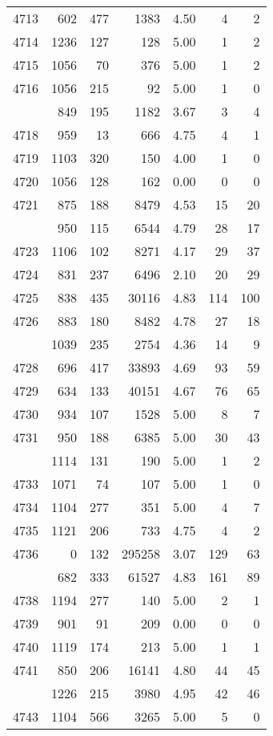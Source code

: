 \documentclass[
]{article}
\begin{document}
\begin{table}
\begin{tabular}[t]{lrrrrrr}
4713 & 602 & 477 & 1383 & 4.50 & 4 & 2\\
4714 & 1236 & 127 & 128 & 5.00 & 1 & 2\\
4715 & 1056 & 70 & 376 & 5.00 & 1 & 2\\
4716 & 1056 & 215 & 92 & 5.00 & 1 & 0\\
\addlinespace
4717 & 849 & 195 & 1182 & 3.67 & 3 & 4\\
4718 & 959 & 13 & 666 & 4.75 & 4 & 1\\
4719 & 1103 & 320 & 150 & 4.00 & 1 & 0\\
4720 & 1056 & 128 & 162 & 0.00 & 0 & 0\\
4721 & 875 & 188 & 8479 & 4.53 & 15 & 20\\
\addlinespace
4722 & 950 & 115 & 6544 & 4.79 & 28 & 17\\
4723 & 1106 & 102 & 8271 & 4.17 & 29 & 37\\
4724 & 831 & 237 & 6496 & 2.10 & 20 & 29\\
4725 & 838 & 435 & 30116 & 4.83 & 114 & 100\\
4726 & 883 & 180 & 8482 & 4.78 & 27 & 18\\
\addlinespace
4727 & 1039 & 235 & 2754 & 4.36 & 14 & 9\\
4728 & 696 & 417 & 33893 & 4.69 & 93 & 59\\
4729 & 634 & 133 & 40151 & 4.67 & 76 & 65\\
4730 & 934 & 107 & 1528 & 5.00 & 8 & 7\\
4731 & 950 & 188 & 6385 & 5.00 & 30 & 43\\
\addlinespace
4732 & 1114 & 131 & 190 & 5.00 & 1 & 2\\
4733 & 1071 & 74 & 107 & 5.00 & 1 & 0\\
4734 & 1104 & 277 & 351 & 5.00 & 4 & 7\\
4735 & 1121 & 206 & 733 & 4.75 & 4 & 2\\
4736 & 0 & 132 & 295258 & 3.07 & 129 & 63\\
\addlinespace
4737 & 682 & 333 & 61527 & 4.83 & 161 & 89\\
4738 & 1194 & 277 & 140 & 5.00 & 2 & 1\\
4739 & 901 & 91 & 209 & 0.00 & 0 & 0\\
4740 & 1119 & 174 & 213 & 5.00 & 1 & 1\\
4741 & 850 & 206 & 16141 & 4.80 & 44 & 45\\
\addlinespace
4742 & 1226 & 215 & 3980 & 4.95 & 42 & 46\\
4743 & 1104 & 566 & 3265 & 5.00 & 5 & 0\\

\end{tabular}
\end{table}
\end{document}
